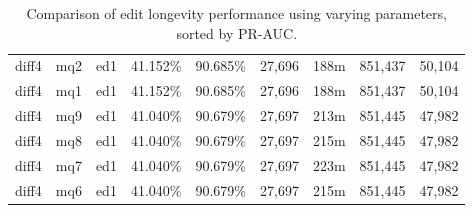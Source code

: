 \begin{sidewaystable}[!ph]
\begin{center}
\begin{tabular}{|c|c|c||c|c||c|c|c|c|}
diff4 & mq2 & ed1 & 41.152\% & 90.685\% & 27,696 & 188m & 851,437 & 50,104 \\
diff4 & mq1 & ed1 & 41.152\% & 90.685\% & 27,696 & 188m & 851,437 & 50,104 \\
diff4 & mq9 & ed1 & 41.040\% & 90.679\% & 27,697 & 213m & 851,445 & 47,982 \\
diff4 & mq8 & ed1 & 41.040\% & 90.679\% & 27,697 & 215m & 851,445 & 47,982 \\
diff4 & mq7 & ed1 & 41.040\% & 90.679\% & 27,697 & 223m & 851,445 & 47,982 \\
diff4 & mq6 & ed1 & 41.040\% & 90.679\% & 27,697 & 215m & 851,445 & 47,982 \\
\hline
\end{tabular}
\end{center}
\caption{Comparison of edit longevity performance using
    varying parameters, sorted by PR-AUC.}
\label{tab:editshoutF}
\end{sidewaystable}
\clearpage

